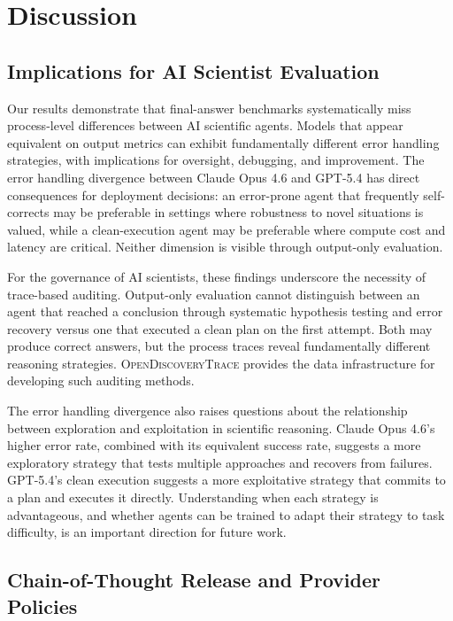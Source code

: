 \documentclass{article}
\newcommand{\dataset}{\textsc{OpenDiscoveryTrace}\xspace}
\begin{document}
\section{Discussion}
\label{sec:discussion}

\subsection{Implications for AI Scientist Evaluation}

Our results demonstrate that final-answer benchmarks systematically miss process-level differences between AI scientific agents. Models that appear equivalent on output metrics can exhibit fundamentally different error handling strategies, with implications for oversight, debugging, and improvement. The error handling divergence between Claude Opus 4.6 and GPT-5.4 has direct consequences for deployment decisions: an error-prone agent that frequently self-corrects may be preferable in settings where robustness to novel situations is valued, while a clean-execution agent may be preferable where compute cost and latency are critical. Neither dimension is visible through output-only evaluation.

For the governance of AI scientists, these findings underscore the necessity of trace-based auditing. Output-only evaluation cannot distinguish between an agent that reached a conclusion through systematic hypothesis testing and error recovery versus one that executed a clean plan on the first attempt. Both may produce correct answers, but the process traces reveal fundamentally different reasoning strategies. \dataset provides the data infrastructure for developing such auditing methods.

The error handling divergence also raises questions about the relationship between exploration and exploitation in scientific reasoning. Claude Opus 4.6's higher error rate, combined with its equivalent success rate, suggests a more exploratory strategy that tests multiple approaches and recovers from failures. GPT-5.4's clean execution suggests a more exploitative strategy that commits to a plan and executes it directly. Understanding when each strategy is advantageous, and whether agents can be trained to adapt their strategy to task difficulty, is an important direction for future work.

\subsection{Chain-of-Thought Release and Provider Policies}
\end{document}
